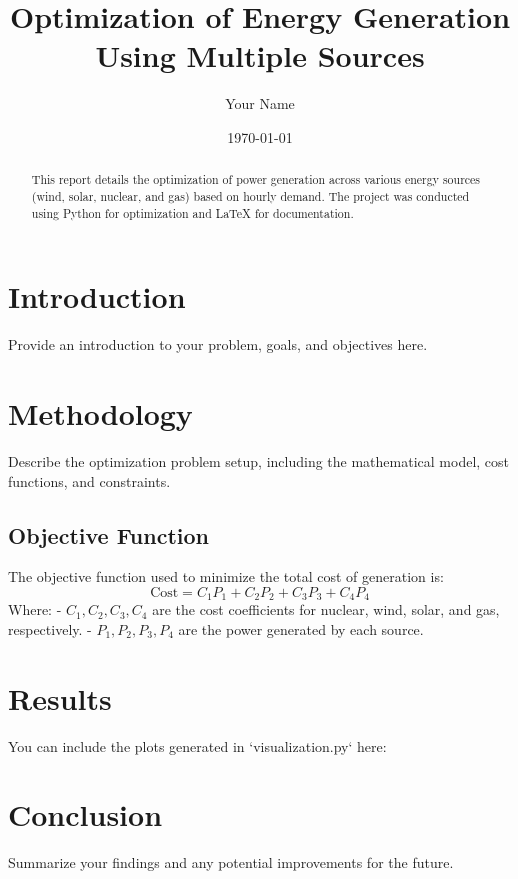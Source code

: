 \documentclass[a4paper,11pt]{article}
\title{Optimization of Energy Generation Using Multiple Sources}
\author{Your Name}
\date{\today}
\begin{document}
\maketitle

\begin{abstract}
This report details the optimization of power generation across various energy sources (wind, solar, nuclear, and gas) based on hourly demand. The project was conducted using Python for optimization and LaTeX for documentation.
\end{abstract}

\section{Introduction}
Provide an introduction to your problem, goals, and objectives here.

\section{Methodology}
Describe the optimization problem setup, including the mathematical model, cost functions, and constraints.

\subsection{Objective Function}
The objective function used to minimize the total cost of generation is:
\[
\text{Cost} = C_1 P_1 + C_2 P_2 + C_3 P_3 + C_4 P_4
\]
Where:
- \(C_1, C_2, C_3, C_4\) are the cost coefficients for nuclear, wind, solar, and gas, respectively.
- \(P_1, P_2, P_3, P_4\) are the power generated by each source.

\section{Results}
You can include the plots generated in `visualization.py` here:



\section{Conclusion}
Summarize your findings and any potential improvements for the future.



\end{document}
